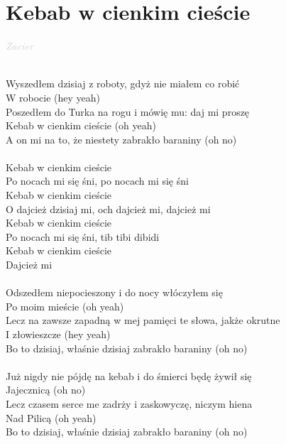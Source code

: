 \documentclass[a5paper, 10pt]{book}
\begin{document}
\newpage
\section{Kebab w cienkim cieście}\textcolor{lightgray}{\textit{Zacier}}\\~\\
\begin{minipage}[t]{0.8\textwidth}
Wyszedłem dzisiaj z roboty, gdyż nie miałem co robić\\
W robocie (hey yeah)\\
Poszedłem do Turka na rogu i mówię mu: daj mi proszę\\
Kebab w cienkim cieście (oh yeah)\\
A on mi na to, że niestety zabrakło baraniny (oh no)\\
\\
\hspace*{5mm}Kebab w cienkim cieście\\
\hspace*{5mm}Po nocach mi się śni, po nocach mi się śni\\
\hspace*{5mm}Kebab w cienkim cieście\\
\hspace*{5mm}O dajcież dzisiaj mi, och dajcież mi, dajcież mi\\

\hspace*{5mm}Kebab w cienkim cieście\\
\hspace*{5mm}Po nocach mi się śni, tib tibi dibidi\\
\hspace*{5mm}Kebab w cienkim cieście\\
\hspace*{5mm}Dajcież mi\\
\\
Odszedłem niepocieszony i do nocy włóczyłem się\\
Po moim mieście (oh yeah)\\
Lecz na zawsze zapadną w mej pamięci te słowa, jakże okrutne\\
I złowieszcze (hey yeah)\\
Bo to dzisiaj, właśnie dzisiaj zabrakło baraniny (oh no)\\
\\
Już nigdy nie pójdę na kebab i do śmierci będę żywił się\\
Jajecznicą (oh no)\\
Lecz czasem serce me zadrży i zaskowyczę, niczym hiena\\
Nad Pilicą (oh yeah)\\
Bo to dzisiaj, właśnie dzisiaj zabrakło baraniny (oh no)\\
\end{minipage}
\end{document}

